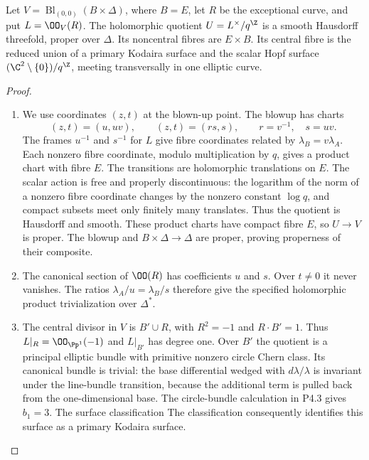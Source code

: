 \begin{proposition}[P4.1]\hypertarget{tag-02WG}{}\label{night:P4.1}\label{stmt:P4.1}

Let $V=\operatorname{Bl}_{(0,0)}(B\times\Delta)$, where $B=E$, let $R$ be
the exceptional curve, and put $L=\OO_V(R)$. The holomorphic quotient
$U=L^\times/q^\Z$ is a smooth Hausdorff threefold, proper over $\Delta$.
Its noncentral fibres are $E\times B$. Its central fibre is the reduced
union of a primary Kodaira surface and the scalar Hopf surface
$(\C^2\setminus\{0\})/q^\Z$, meeting transversally in one elliptic curve.
\end{proposition}
\begin{proof}

\begin{enumerate}[label={$\langle1\rangle$\arabic*.},leftmargin=*]
\item We use coordinates $(z,t)$ at the blown-up point. The blowup has charts
\[
 (z,t)=(u,uv),\qquad (z,t)=(rs,s),\qquad r=v^{-1},\quad s=uv.
\]
The frames $u^{-1}$ and $s^{-1}$ for $L$ give fibre coordinates related by
$\lambda_B=v\lambda_A$. Each nonzero fibre coordinate, modulo multiplication
by $q$, gives a product chart with fibre $E$. The transitions are holomorphic
translations on $E$. The scalar action is free and properly discontinuous:
the logarithm of the norm of a nonzero fibre coordinate changes by the
nonzero constant $\log q$, and compact subsets meet only finitely many
translates. Thus the quotient is Hausdorff and smooth. These product charts
have compact fibre $E$, so $U\to V$ is proper. The blowup and $B\times\Delta
\to\Delta$ are proper, proving properness of their composite.

\item The canonical section of $\OO(R)$ has coefficients $u$ and $s$. Over
$t\ne0$ it never vanishes. The ratios $\lambda_A/u=\lambda_B/s$ therefore
give the specified holomorphic product trivialization over $\Delta^*$.

\item The central divisor in $V$ is $B'\cup R$, with $R^2=-1$ and $R\cdot B'=1$.
Thus $L|_R=\OO_{\Pp^1}(-1)$ and $L|_{B'}$ has degree one. Over $B'$ the
quotient is a principal elliptic bundle with primitive nonzero circle Chern
class. Its canonical bundle is trivial: the base differential wedged with
$d\lambda/\lambda$ is invariant under the line-bundle transition, because
the additional term is pulled back from the one-dimensional base. The
circle-bundle calculation in P4.3 gives $b_1=3$. The surface classification
The classification \cite[Chapter~VI, Theorem~1.1 and Table~10, pp.~243--244]{BHPV2004E} consequently identifies this surface as
a primary Kodaira surface.


\end{enumerate}
\end{proof}
